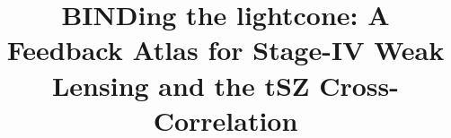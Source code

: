 \documentclass[linenumbers,trackchanges, twocolumn]{aastex701}
\begin{document}
\title{BINDing the lightcone: A Feedback Atlas for Stage-IV Weak Lensing and the tSZ Cross-Correlation}

\end{document}
